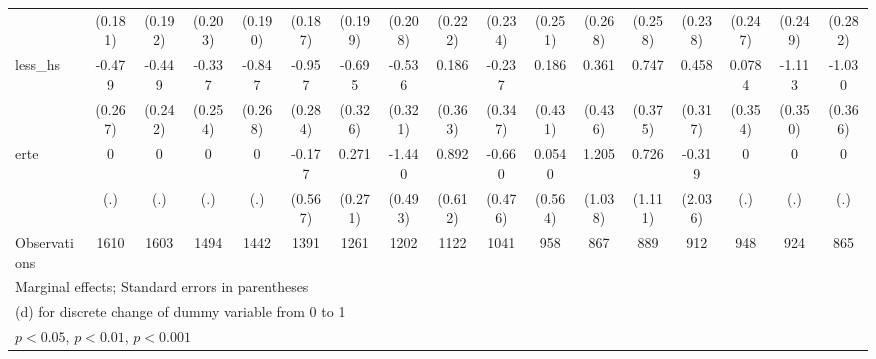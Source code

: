 {\begin{tabular}{l*{16}{c}}
                    &     (0.181)         &     (0.192)         &     (0.203)         &     (0.190)         &     (0.187)         &     (0.199)         &     (0.208)         &     (0.222)         &     (0.234)         &     (0.251)         &     (0.268)         &     (0.258)         &     (0.238)         &     (0.247)         &     (0.249)         &     (0.282)         \\
[1em]
less\_hs             &      -0.479         &      -0.449         &      -0.337         &      -0.847\sym{**} &      -0.957\sym{***}&      -0.695\sym{*}  &      -0.536         &       0.186         &      -0.237         &       0.186         &       0.361         &       0.747\sym{*}  &       0.458         &      0.0784         &      -1.113\sym{**} &      -1.030\sym{**} \\
                    &     (0.267)         &     (0.242)         &     (0.254)         &     (0.268)         &     (0.284)         &     (0.326)         &     (0.321)         &     (0.363)         &     (0.347)         &     (0.431)         &     (0.436)         &     (0.375)         &     (0.317)         &     (0.354)         &     (0.350)         &     (0.366)         \\
[1em]
erte                &           0         &           0         &           0         &           0         &      -0.177         &       0.271         &      -1.440\sym{**} &       0.892         &      -0.660         &      0.0540         &       1.205         &       0.726         &      -0.319         &           0         &           0         &           0         \\
                    &         (.)         &         (.)         &         (.)         &         (.)         &     (0.567)         &     (0.271)         &     (0.493)         &     (0.612)         &     (0.476)         &     (0.564)         &     (1.038)         &     (1.111)         &     (2.036)         &         (.)         &         (.)         &         (.)         \\
\hline
Observations        &        1610         &        1603         &        1494         &        1442         &        1391         &        1261         &        1202         &        1122         &        1041         &         958         &         867         &         889         &         912         &         948         &         924         &         865         \\
\hline\hline
\multicolumn{17}{l}{\footnotesize Marginal effects; Standard errors in parentheses}\\
\multicolumn{17}{l}{\footnotesize  (d) for discrete change of dummy variable from 0 to 1}\\
\multicolumn{17}{l}{\footnotesize \sym{*} \(p<0.05\), \sym{**} \(p<0.01\), \sym{***} \(p<0.001\)}\\
\end{tabular}
}
